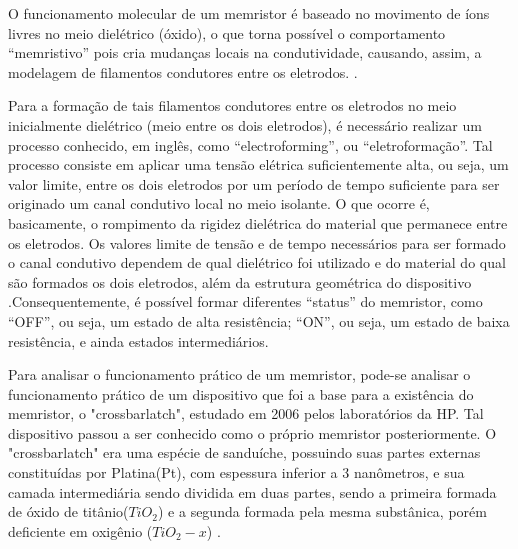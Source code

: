 \documentclass{ceel}
\begin{document}
\begin{multicols}{2}
O funcionamento molecular de um memristor é baseado no movimento de íons livres no meio dielétrico (óxido), o que torna possível o comportamento “memristivo” pois cria mudanças locais na condutividade, causando, assim, a modelagem de filamentos condutores entre os eletrodos. \cite{us}. %

Para a formação de tais filamentos condutores entre os eletrodos no meio inicialmente dielétrico (meio entre os dois eletrodos), é necessário realizar um processo conhecido, em inglês, como “electroforming”, ou “eletroformação”. Tal %
processo consiste em aplicar uma tensão elétrica suficientemente alta, ou seja, um valor limite, entre os dois eletrodos por um período de tempo suficiente para ser originado um canal condutivo local no meio isolante. O que ocorre é, basicamente, o rompimento da rigidez dielétrica do material que permanece entre os eletrodos. %
Os valores limite de tensão e de tempo necessários para ser formado o canal condutivo dependem de qual dielétrico foi utilizado e do material do qual são formados os dois eletrodos, além da estrutura geométrica do dispositivo \cite{us}.Consequentemente, é possível formar diferentes “status” do memristor, como “OFF”, ou seja, um estado de alta resistência; “ON”, ou seja, um estado de baixa resistência, e ainda estados intermediários. %

Para analisar o funcionamento prático de um memristor, pode-se analisar o funcionamento prático de um dispositivo que foi a base para a existência do memristor, o "crossbarlatch", estudado em 2006 pelos %
laboratórios da HP. Tal dispositivo passou a ser conhecido como o próprio memristor posteriormente. O "crossbarlatch" era uma espécie de sanduíche, possuindo suas partes externas constituídas por Platina(Pt), com espessura inferior a 3 nanômetros, e sua camada intermediária sendo dividida em duas partes, sendo a primeira formada de óxido de titânio($TiO_2$) e a segunda formada pela mesma substânica, porém deficiente em oxigênio ($TiO_2-x$) \cite{construcao}.  


\end{multicols}
\end{document}
